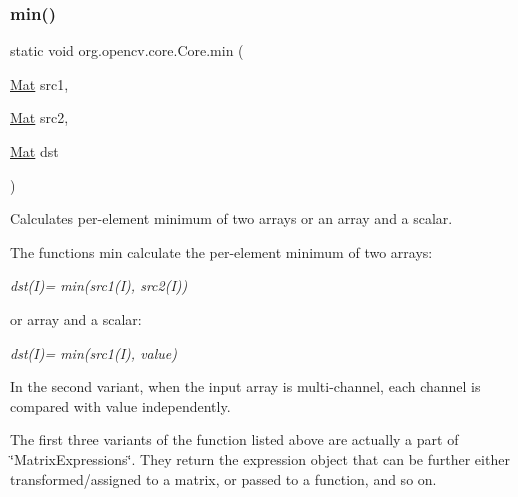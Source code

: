 \subsubsection{\texorpdfstring{min()}{min()}\hspace{0.1cm}{\footnotesize\ttfamily [1/2]}}
{\footnotesize\ttfamily static void org.\+opencv.\+core.\+Core.\+min (\begin{DoxyParamCaption}\item[{\mbox{\hyperlink{classorg_1_1opencv_1_1core_1_1_mat}{Mat}}}]{src1,  }\item[{\mbox{\hyperlink{classorg_1_1opencv_1_1core_1_1_mat}{Mat}}}]{src2,  }\item[{\mbox{\hyperlink{classorg_1_1opencv_1_1core_1_1_mat}{Mat}}}]{dst }\end{DoxyParamCaption})\hspace{0.3cm}{\ttfamily [static]}}

Calculates per-\/element minimum of two arrays or an array and a scalar.

The functions {\ttfamily min} calculate the per-\/element minimum of two arrays\+:

{\itshape dst(\+I)= min(src1(\+I), src2(\+I))}

or array and a scalar\+:

{\itshape dst(\+I)= min(src1(\+I), value)}

In the second variant, when the input array is multi-\/channel, each channel is compared with {\ttfamily value} independently.

The first three variants of the function listed above are actually a part of \char`\"{}\+Matrix\+Expressions\char`\"{}. They return the expression object that can be further either transformed/assigned to a matrix, or passed to a function, and so on.


